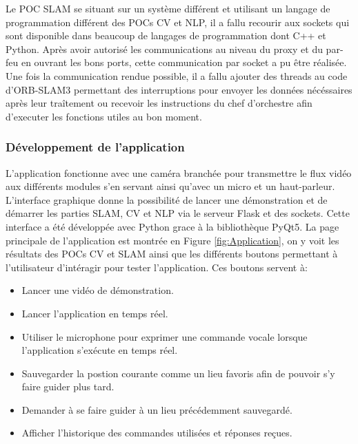 \documentclass[11pt]{article}
\begin{document}
        Le POC SLAM se situant sur un système différent et utilisant un langage de programmation différent des POCs CV et NLP, il a fallu
        recourir aux sockets qui sont disponible dans beaucoup de langages de programmation dont C++ et Python. Après avoir autorisé les 
        communications au niveau du proxy et du par-feu en ouvrant les bons ports, cette communication par socket a pu être réalisée.
        Une fois la communication rendue possible, il a fallu ajouter des threads au code d'ORB-SLAM3 permettant des interruptions
        pour envoyer les données nécéssaires après leur traîtement ou recevoir les instructions du chef d'orchestre
        afin d'executer les fonctions utiles au bon moment.


      \subsubsection{Développement de l'application}         
        L'application fonctionne avec une caméra branchée pour transmettre le flux vidéo aux différents modules s'en servant ainsi qu'avec
        un micro et un haut-parleur.  
        L'interface graphique donne la possibilité de lancer une démonstration et de démarrer les parties SLAM, CV et NLP via le serveur Flask 
        et des sockets. Cette interface a été développée avec Python grace à la bibliothèque PyQt5. La page principale de l'application est
        montrée en Figure \ref{fig:Application}, on y voit les résultats des POCs CV et SLAM ainsi que les différents boutons permettant
        à l'utilisateur d'intéragir pour tester l'application. Ces boutons servent à: 

        \begin{itemize}
          \item Lancer une vidéo de démonstration.
          \item Lancer l'application en temps réel.
          \item Utiliser le microphone pour exprimer une commande vocale lorsque l'application s'exécute en temps réel.
          \item Sauvegarder la postion courante comme un lieu favoris afin de pouvoir s'y faire guider plus tard.
          \item Demander à se faire guider à un lieu précédemment sauvegardé.
          \item Afficher l'historique des commandes utilisées et réponses reçues.   
        \end{itemize} 
\end{document}
